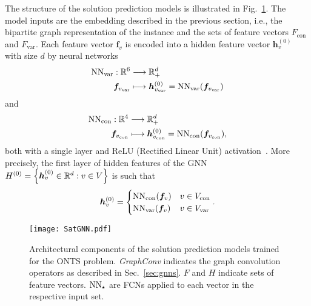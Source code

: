 The structure of the solution prediction models is illustrated in Fig.~\ref{fig:satgnn}.
The model inputs are the embedding described in the previous section, i.e., the bipartite graph representation of the instance and the sets of feature vectors $F_\textrm{con}$ and $F_\textrm{var}$.
Each feature vector $\bm{f}_v$ is encoded into a hidden feature vector $\bm{h}^{(0)}_v$ with size $d$ by neural networks
\begin{align*}
    {\rm NN}_{\rm var}:\mathbb{R}^6& \longrightarrow\mathbb{R}^{d}_+ \\
    \bm{f}_{v_{\rm var}} &\longmapsto \bm{h}^{(0)}_{v_{\rm var}} = {\rm NN}_{\rm var}(\bm{f}_{v_{\rm var}})
\end{align*}
and
\begin{align*}
    {\rm NN}_{\rm con}:\mathbb{R}^4& \longrightarrow\mathbb{R}^{d}_+ \\
    \bm{f}_{v_{\rm con}} &\longmapsto \bm{h}^{(0)}_{v_{\rm con}} = {\rm NN}_{\rm con}(\bm{f}_{v_{\rm con}})
,\end{align*}
both with a single layer and ReLU (Rectified Linear Unit) activation~\cite{goodfellowQualitativelyCharacterizingNeural2015}.
More precisely, the first layer of hidden features of the GNN $H^{(0)}=\left\{ \bm{h}^{(0)}_v \in \mathbb{R}^{d} : v \in V \right\} $ is such that \[
\bm{h}^{(0)}_v = \begin{cases}
    {\rm NN}_{\rm con}(\bm{f}_v) & v \in V_\textrm{con} \\
    {\rm NN}_{\rm var}(\bm{f}_v) & v \in V_\textrm{var}
\end{cases}
.\] 

\begin{figure}[h]
    \centering
    \texttt{[image: SatGNN.pdf]}
    \caption{Architectural components of the solution prediction models trained for the ONTS problem. \emph{GraphConv} indicates the graph convolution operators as described in Sec.~\ref{sec:gnns}. $F$ and $H$ indicate sets of feature vectors. ${\rm NN}_{\star}$ are FCNs applied to each vector in the respective input set.}
    \label{fig:satgnn}
\end{figure}


